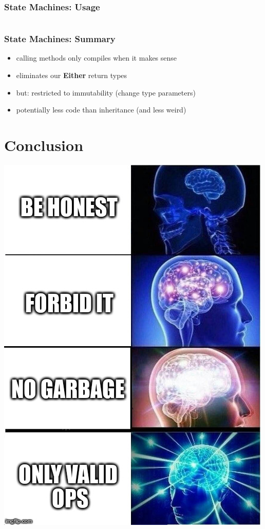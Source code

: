 \documentclass{beamer}
\begin{document}
\begin{frame}
  \frametitle{State Machines: Usage}
  \inputminted[firstline=63]{scala}{../src/main/scala/de/codecentric/four/VendingMachine.scala}
\end{frame}

\begin{frame}
  \frametitle{State Machines: Summary}
  \begin{itemize}
  \item calling methods only compiles when it makes sense
  \item eliminates our \textbf{Either} return types
  \item but: restricted to immutability (change type parameters)
  \item potentially less code than inheritance (and less weird)
  \end{itemize}
\end{frame}

\section{Conclusion}

\begin{frame}
  \begin{center}
    \includegraphics[width=.55\textwidth]{../pics/meme.jpg}
  \end{center}

\end{frame}
\end{document}
